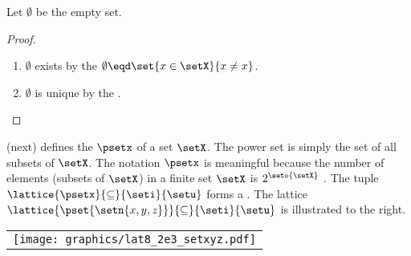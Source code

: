 \begin{definition}
\label{def:set_emptyset}
\end{definition}

\begin{proposition}
\label{prop:set_emptyset}
Let $\emptyset$ be the empty set.
\end{proposition}
\begin{proof}
  \begin{enumerate}
    \item $\emptyset$ exists by the  
            $\emptyset \eqd \set{x\in\setX}{x\ne x}$.
    \item $\emptyset$ is unique by the  .
  \end{enumerate}
\end{proof}



\begin{minipage}[c]{2\tw/3}
   (next) defines the  $\psetx$ of a set $\setX$.
  The power set is simply the set of all subsets of $\setX$.
  The notation $\psetx$ is meaningful because the number of elements (subsets of $\setX$)
  in a finite set $\setX$ is $2^\seto{\setX}$ .
  The tuple $\lattice{\psetx}{\subseteq}{\seti}{\setu}$ forms a  .
  The lattice $\lattice{\pset{\setn{x,y,z}}}{\subseteq}{\seti}{\setu}$
  is illustrated to the right.
\end{minipage}%
\hfill%
\begin{tabular}{c}%
  \texttt{[image: graphics/lat8\_2e3\_setxyz.pdf]}%
\end{tabular}

